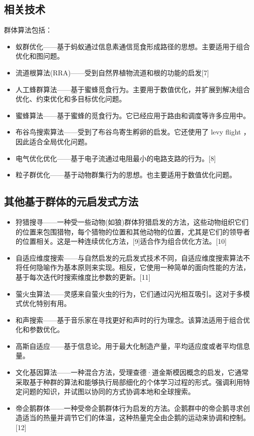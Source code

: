\subsection{相关技术}
群体算法包括：
\begin{itemize}
\item 蚁群优化——基于蚂蚁通过信息素通信觅食形成路径的思想。主要适用于组合优化和图问题。
\item 流道根算法(RRA)——受到自然界植物流道和根的功能的启发[7]
\item 人工蜂群算法——基于蜜蜂觅食行为。主要用于数值优化，并扩展到解决组合优化、约束优化和多目标优化问题。
\item 蜜蜂算法——基于蜜蜂的觅食行为。它已经应用于路由和调度等许多应用中。
\item 布谷鸟搜索算法——受到了布谷鸟寄生孵卵的启发。它还使用了 levy flight ，因此适合全局优化问题。
\item 电气优化优化——基于电子流通过电阻最小的电路支路的行为。[8]
\item 粒子群优化——基于动物群集行为的思想。也主要适用于数值优化问题。
\end{itemize}

\subsection{其他基于群体的元启发式方法}
\begin{itemize}
\item 狩猎搜寻——一种受一些动物(如狼)群体狩猎启发的方法，这些动物组织它们的位置来包围猎物，每个猎物的位置和其他动物的位置，尤其是它们的领导者的位置相关。这是一种连续优化方法，[9]适合作为组合优化方法。[10]
\item 自适应维度搜索——与自然启发的元启发式技术不同，自适应维度搜索算法不将任何隐喻作为基本原则来实现。相反，它使用一种简单的面向性能的方法，基于每次迭代时搜索维度比参数的更新。[11]
\item 萤火虫算法——灵感来自萤火虫的行为，它们通过闪光相互吸引。这对于多模式优化特别有用。
\item 和声搜索——基于音乐家在寻找更好和声时的行为理念。该算法适用于组合优化和参数优化。
\item 高斯自适应——基于信息论。用于最大化制造产量，平均适应度或者平均信息量。
\item 文化基因算法——一种混合方法，受理查德·道金斯模因概念的启发，它通常采取基于种群的算法和能够执行局部细化的个体学习过程的形式。强调利用特定问题的知识，并试图以协同的方式协调本地和全球搜索。
\item 帝企鹅群体——一种受帝企鹅群体行为启发的方法。企鹅群中的帝企鹅寻求创造适当的热量并调节它们的体温，这种热量完全由企鹅的运动来协调和控制。[12]
\end{itemize}

